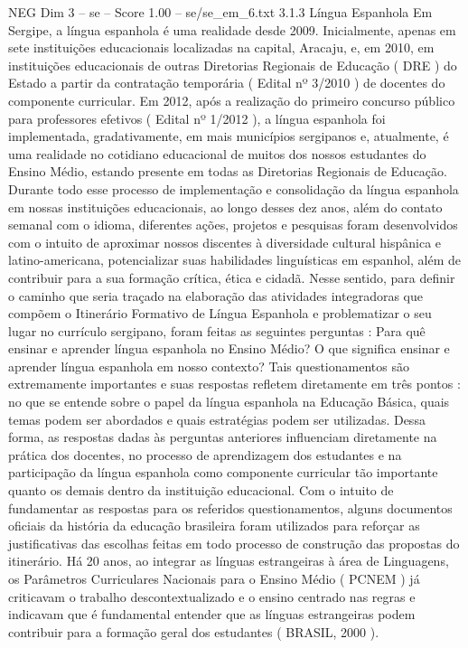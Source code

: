 \begin{textsample}{NEG Dim 3 – se – Score 1.00 – se/se\_em\_6.txt}  \label{ex:f3_neg_126}
3.1.3 Língua Espanhola Em Sergipe, a língua espanhola é uma realidade desde 2009.
Inicialmente, apenas em sete instituições educacionais localizadas na capital, Aracaju, e, em 2010, em instituições educacionais de outras Diretorias Regionais de Educação ( DRE ) do Estado a partir da contratação temporária ( Edital nº 3/2010 ) de docentes do componente curricular.
Em 2012, após a realização do primeiro concurso público para professores efetivos ( Edital nº 1/2012 ), a língua espanhola foi implementada, gradativamente, em mais municípios sergipanos e, atualmente, é uma realidade no cotidiano educacional de muitos dos nossos estudantes do Ensino Médio, estando presente em todas as Diretorias Regionais de Educação.
Durante todo esse processo de implementação e consolidação da língua espanhola em nossas instituições educacionais, ao longo desses dez anos, além do contato semanal com o idioma, diferentes ações, projetos e pesquisas foram desenvolvidos com o intuito de aproximar nossos discentes à diversidade cultural hispânica e latino-americana, potencializar suas habilidades linguísticas em espanhol, além de contribuir para a sua formação crítica, ética e cidadã.
Nesse sentido, para definir o caminho que seria traçado na elaboração das atividades integradoras que compõem o Itinerário Formativo de Língua Espanhola e problematizar o seu lugar no currículo sergipano, foram feitas as seguintes perguntas : Para quê ensinar e aprender língua espanhola no Ensino Médio?
O que significa ensinar e aprender língua espanhola em nosso contexto?
Tais questionamentos são extremamente importantes e suas respostas refletem diretamente em três pontos : no que se entende sobre o papel da língua espanhola na Educação Básica, quais temas podem ser abordados e quais estratégias podem ser utilizadas.
Dessa forma, as respostas dadas às perguntas anteriores influenciam diretamente na prática dos docentes, no processo de aprendizagem dos estudantes e na participação da língua espanhola como componente curricular tão importante quanto os demais dentro da instituição educacional.
Com o intuito de fundamentar as respostas para os referidos questionamentos, alguns documentos oficiais da história da educação brasileira foram utilizados para reforçar as justificativas das escolhas feitas em todo processo de construção das propostas do itinerário.
Há 20 anos, ao integrar as línguas estrangeiras à área de Linguagens, os Parâmetros Curriculares Nacionais para o Ensino Médio ( PCNEM ) já criticavam o trabalho descontextualizado e o ensino centrado nas regras e indicavam que é fundamental entender que as línguas estrangeiras podem contribuir para a formação geral dos estudantes ( BRASIL, 2000 ).

\end{textsample}
